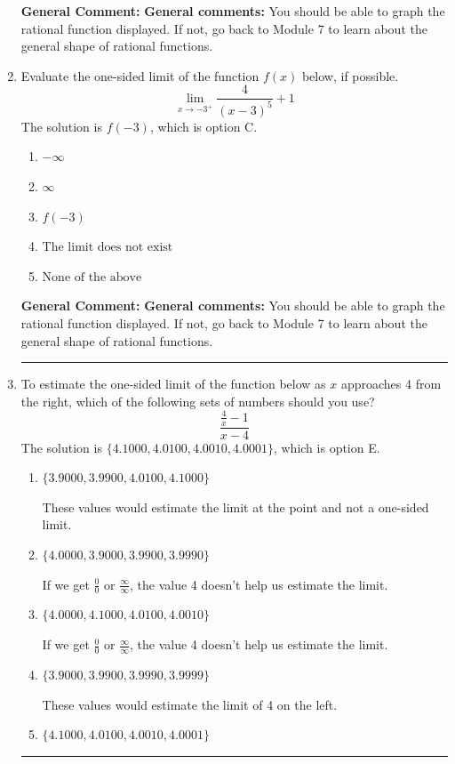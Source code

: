 \documentclass{extbook}[14pt]
\newcommand{\litem}[1]{\item #1

\rule{\textwidth}{0.4pt}}
\begin{document}
\begin{enumerate}
{\textbf{General Comment:} \textbf{General comments:} You should be able to graph the rational function displayed. If not, go back to Module 7 to learn about the general shape of rational functions.
}
\litem{
Evaluate the one-sided limit of the function $f(x)$ below, if possible.
\[ \lim_{x \rightarrow -3^+} \frac{4}{(x-3)^5}+1 \]The solution is \( f(-3) \), which is option C.\begin{enumerate}[label=\Alph*.]
\item \( -\infty \)


\item \( \infty \)


\item \( f(-3) \)


\item \( \text{The limit does not exist} \)


\item \( \text{None of the above} \)


\end{enumerate}

\textbf{General Comment:} \textbf{General comments:} You should be able to graph the rational function displayed. If not, go back to Module 7 to learn about the general shape of rational functions.
}
\litem{
To estimate the one-sided limit of the function below as $x$ approaches 4 from the right, which of the following sets of numbers should you use?
\[ \frac{\frac{4}{x} - 1}{x - 4} \]The solution is \( \{ 4.1000, 4.0100, 4.0010, 4.0001 \} \), which is option E.\begin{enumerate}[label=\Alph*.]
\item \( \{ 3.9000, 3.9900, 4.0100, 4.1000 \} \)

These values would estimate the limit at the point and not a one-sided limit.
\item \( \{ 4.0000, 3.9000, 3.9900, 3.9990 \} \)

If we get $\frac{0}{0}$ or $\frac{\infty}{\infty}$, the value 4 doesn't help us estimate the limit.
\item \( \{ 4.0000, 4.1000, 4.0100, 4.0010 \} \)

If we get $\frac{0}{0}$ or $\frac{\infty}{\infty}$, the value 4 doesn't help us estimate the limit.
\item \( \{ 3.9000, 3.9900, 3.9990, 3.9999 \} \)

These values would estimate the limit of 4 on the left.
\item \( \{ 4.1000, 4.0100, 4.0010, 4.0001 \} \)


\end{enumerate}}
\end{enumerate}
\end{document}
